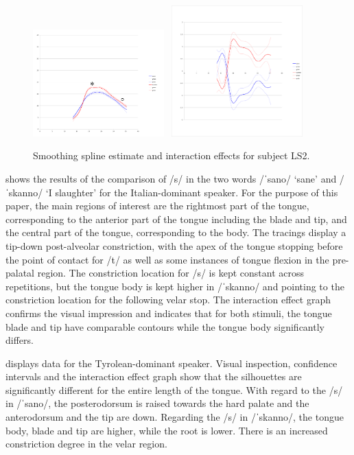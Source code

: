\documentclass[output=paper]{LSP/langsci}
\begin{document}
\begin{figure}[p]
\includegraphics[width=0.45\textwidth]{illustrations/sprea_fig2a}~
\includegraphics[width=0.45\textwidth,trim=4 68 4 32,clip]{illustrations/sprea_fig2b}
\caption{Smoothing spline estimate and interaction effects for subject LS2.}
\label{fig:sprea:2}  
\end{figure}

 shows the results of the comparison of /s/ in the two words /ˈsano/ `sane' and /ˈskanno/ `I slaughter' for the Italian-dominant speaker. For the purpose of this paper, the main regions of interest are the rightmost part of the tongue, corresponding to the anterior part of the tongue including the blade and tip, and the central part of the tongue, corresponding to the body. The tracings display a tip-down post-alveolar constriction, with the apex of the tongue stopping before the point of contact for /t/ as well as some instances of tongue flexion in the pre-palatal region. The constriction location for /s/ is kept constant across repetitions, but the tongue body is kept higher in /ˈskanno/ and pointing to the constriction location for the following velar stop. The interaction effect graph confirms the visual impression and indicates that for both stimuli, the tongue blade and tip have comparable contours while the tongue body significantly differs.


 displays data for the Tyrolean-dominant speaker. Visual inspection, confidence intervals and the interaction effect graph show that the silhouettes are significantly different for the entire length of the tongue. With regard to the /s/ in /ˈsano/, the posterodorsum is raised towards the hard palate and the anterodorsum and the tip are down. Regarding the /s/ in /ˈskanno/, the tongue body, blade and tip are higher, while the root is lower. There is an increased constriction degree in the velar region.
\end{document}
